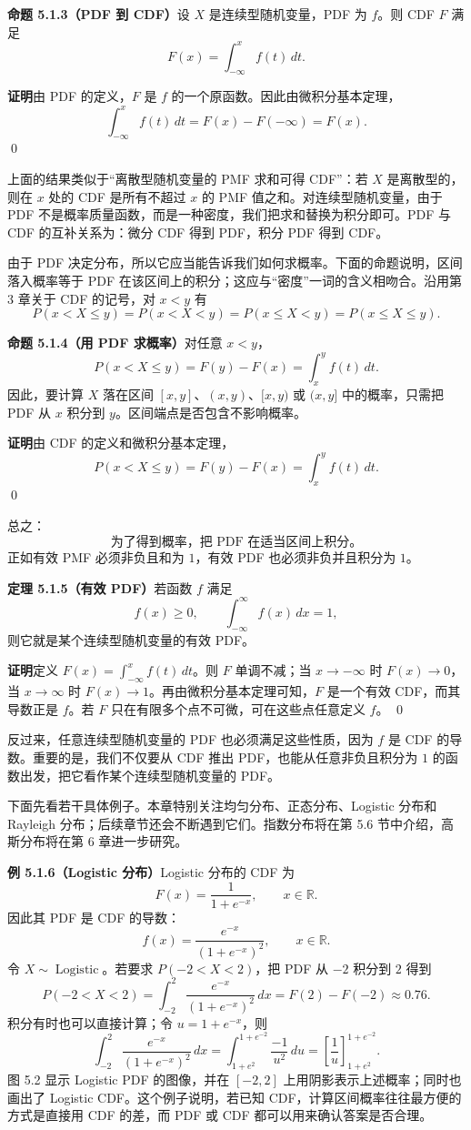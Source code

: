 \documentclass[UTF8, 12pt, fontset=fandol, oneside]{ctexart}
\begin{document}
\noindent\textbf{命题 5.1.3（PDF 到 CDF）}\quad 设 $X$ 是连续型随机变量，PDF 为 $f$。则 CDF $F$ 满足
\[
  F(x)=\int_{-\infty}^x f(t)\,dt.
\]

\noindent\textbf{证明}\quad 由 PDF 的定义，$F$ 是 $f$ 的一个原函数。因此由微积分基本定理，
\[
  \int_{-\infty}^x f(t)\,dt=F(x)-F(-\infty)=F(x).
\]
\qed

上面的结果类似于“离散型随机变量的 PMF 求和可得 CDF”：若 $X$ 是离散型的，则在 $x$ 处的 CDF 是所有不超过 $x$ 的 PMF 值之和。对连续型随机变量，由于 PDF 不是概率质量函数，而是一种密度，我们把求和替换为积分即可。PDF 与 CDF 的互补关系为：微分 CDF 得到 PDF，积分 PDF 得到 CDF。

由于 PDF 决定分布，所以它应当能告诉我们如何求概率。下面的命题说明，区间落入概率等于 PDF 在该区间上的积分；这应与“密度”一词的含义相吻合。沿用第 3 章关于 CDF 的记号，对 $x<y$ 有
\[
  P(x<X\le y)=P(x<X<y)=P(x\le X<y)=P(x\le X\le y).
\]

\noindent\textbf{命题 5.1.4（用 PDF 求概率）}\quad 对任意 $x<y$，
\[
  P(x<X\le y)=F(y)-F(x)=\int_x^y f(t)\,dt.
\]
因此，要计算 $X$ 落在区间 $[x,y]$、$(x,y)$、$[x,y)$ 或 $(x,y]$ 中的概率，只需把 PDF 从 $x$ 积分到 $y$。区间端点是否包含不影响概率。

\noindent\textbf{证明}\quad 由 CDF 的定义和微积分基本定理，
\[
  P(x<X\le y)=F(y)-F(x)=\int_x^y f(t)\,dt.
\]
\qed

总之：
\[
  \text{为了得到概率，把 PDF 在适当区间上积分。}
\]
正如有效 PMF 必须非负且和为 $1$，有效 PDF 也必须非负并且积分为 $1$。

\noindent\textbf{定理 5.1.5（有效 PDF）}\quad 若函数 $f$ 满足
\[
  f(x)\ge 0,\qquad \int_{-\infty}^{\infty} f(x)\,dx=1,
\]
则它就是某个连续型随机变量的有效 PDF。

\noindent\textbf{证明}\quad 定义 $F(x)=\int_{-\infty}^{x} f(t)\,dt$。则 $F$ 单调不减；当 $x\to -\infty$ 时 $F(x)\to0$，当 $x\to\infty$ 时 $F(x)\to1$。再由微积分基本定理可知，$F$ 是一个有效 CDF，而其导数正是 $f$。若 $F$ 只在有限多个点不可微，可在这些点任意定义 $f$。
\qed

反过来，任意连续型随机变量的 PDF 也必须满足这些性质，因为 $f$ 是 CDF 的导数。重要的是，我们不仅要从 CDF 推出 PDF，也能从任意非负且积分为 $1$ 的函数出发，把它看作某个连续型随机变量的 PDF。

下面先看若干具体例子。本章特别关注均匀分布、正态分布、Logistic 分布和 Rayleigh 分布；后续章节还会不断遇到它们。指数分布将在第 5.6 节中介绍，高斯分布将在第 6 章进一步研究。

\noindent\textbf{例 5.1.6（Logistic 分布）}\quad Logistic 分布的 CDF 为
\[
  F(x)=\frac{1}{1+e^{-x}},\qquad x\in\mathbb{R}.
\]
因此其 PDF 是 CDF 的导数：
\[
  f(x)=\frac{e^{-x}}{(1+e^{-x})^2},\qquad x\in\mathbb{R}.
\]
令 $X\sim\operatorname{Logistic}$。若要求 $P(-2<X<2)$，把 PDF 从 $-2$ 积分到 $2$ 得到
\[
  P(-2<X<2)=\int_{-2}^{2}\frac{e^{-x}}{(1+e^{-x})^2}\,dx
  =F(2)-F(-2)\approx 0.76.
\]
积分有时也可以直接计算；令 $u=1+e^{-x}$，则
\[
  \int_{-2}^{2}\frac{e^{-x}}{(1+e^{-x})^2}\,dx
  =\int_{1+e^2}^{1+e^{-2}}\frac{-1}{u^2}\,du
  =\left[\frac{1}{u}\right]_{1+e^2}^{1+e^{-2}}.
\]
图 5.2 显示 Logistic PDF 的图像，并在 $[-2,2]$ 上用阴影表示上述概率；同时也画出了 Logistic CDF。这个例子说明，若已知 CDF，计算区间概率往往最方便的方式是直接用 CDF 的差，而 PDF 或 CDF 都可以用来确认答案是否合理。
\end{document}
